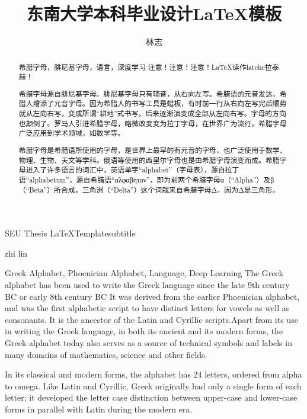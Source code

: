 \documentclass[bachelor,nocolorlinks, printoneside]{seuthesis} %
\begin{document}

\title{东南大学本科毕业设计\LaTeX 模板}{}{SEU Thesis \LaTeX Template}{subtitle}
\author{林志}{zhi lin}




\maketitle

\begin{abstract}{希腊字母，腓尼基字母，语言，深度学习}
注意！注意！注意！\LaTeX 读作latehe拉泰赫！

希腊字母源自腓尼基字母。腓尼基字母只有辅音，从右向左写。希腊语的元音发达，希腊人增添了元音字母。因为希腊人的书写工具是蜡板，有时前一行从右向左写完后顺势就从左向右写，变成所谓“耕地”式书写，后来逐渐演变成全部从左向右写。字母的方向也颠倒了。罗马人引进希腊字母，略微改变变为拉丁字母，在世界广为流行。希腊字母广泛应用到学术领域，如数学等。

希腊字母是希腊语所使用的字母，是世界上最早的有元音的字母，也广泛使用于数学、物理、生物、天文等学科。俄语等使用的西里尔字母也是由希腊字母演变而成。希腊字母进入了许多语言的词汇中，英语单字“alphabet”（字母表），源自拉丁语“alphabetum”，源自希腊语“αλφαβητον”，即为前两个希腊字母α（“Alpha”）及β（“Beta”）所合成，三角洲（“Delta”）这个词就来自希腊字母Δ，因为Δ是三角形。
\end{abstract}

\begin{englishabstract}{Greek Alphabet, Phoenician Alphabet, Language, Deep Learning}
The Greek alphabet has been used to write the Greek language since the late 9th century BC or early 8th century BC It was derived from the earlier Phoenician alphabet, and was the first alphabetic script to have distinct letters for vowels as well as consonants. It is the ancestor of the Latin and Cyrillic scripts.Apart from its use in writing the Greek language, in both its ancient and its modern forms, the Greek alphabet today also serves as a source of technical symbols and labels in many domains of mathematics, science and other fields.

In its classical and modern forms, the alphabet has 24 letters, ordered from alpha to omega. Like Latin and Cyrillic, Greek originally had only a single form of each letter; it developed the letter case distinction between upper-case and lower-case forms in parallel with Latin during the modern era.
\end{englishabstract}
\end{document}
